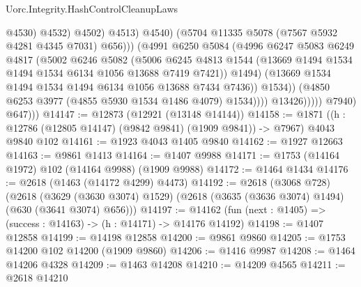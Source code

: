 \begin{lexlean}{Uorc.Integrity.HashControlCleanupLaws}
\begin{coremodule}
                                            @4530)
                                          @4532)
                                        @4502)
                                      @4513)
                                    @4540)
                                  (@5704 @11335 @5078 (@7567 @5932 @4281 @4345 @7031) @656)))
                              (@4991
                                @6250
                                @5084
                                (@4996
                                  @6247
                                  @5083
                                  @6249
                                  @4817
                                  (@5002
                                    @6246
                                    @5082
                                    (@5006
                                      @6245
                                      @4813
                                      @1544
                                      (@13669
                                        @1494
                                        @1534
                                        @1494
                                        @1534
                                        @6134
                                        @1056
                                        @13688
                                        @7419
                                        @7421))
                                    @1494)
                                  (@13669 @1534 @1494 @1534 @1494 @6134 @1056 @13688 @7434 @7436))
                                @1534))
                            (@4850 @6253 @3977 (@4855 @5930 @1534 @1486 @4079) @1534))))
                      @13426)))))
            @7940)
          @647)))
@14147 := @12873 (@12921 (@13148 @14144))
@14158 := @1871 ((h : @12786 (@12805 @14147) (@9842 @9841) (@1909 @9841)) -> @7967) @4043 @9840 @102
@14161 := @1923 @4043 @1405 @9840
@14162 := @1927 @12663
@14163 := @9861 @1413
@14164 := @1407 @9988
@14171 := @1753 (@14164 @1972) @102 (@14164 @9988) (@1909 @9988)
@14172 := @1464 @1434
@14176 := @2618 (@1463 (@14172 @4299) @4473)
@14192 := @2618
    (@3068 @728)
    (@2618
      (@3629 (@3630 @3074) @1529)
      (@2618 (@3635 (@3636 @3074) @1494) (@630 (@3641 @3074) @656)))
@14197 := @14162 (fun (next : @1405) => (success : @14163) -> (h : @14171) -> @14176 @14192)
@14198 := @1407 @12858
@14199 := @14198 @12858
@14200 := @9861 @9860
@14205 := @1753 @14200 @102 @14200 (@1909 @9860)
@14206 := @1416 @9987
@14208 := @1464 @14206 @4328
@14209 := @1463 @14208
@14210 := @14209 @4565
@14211 := @2618 @14210

\end{coremodule}
\end{lexlean}
